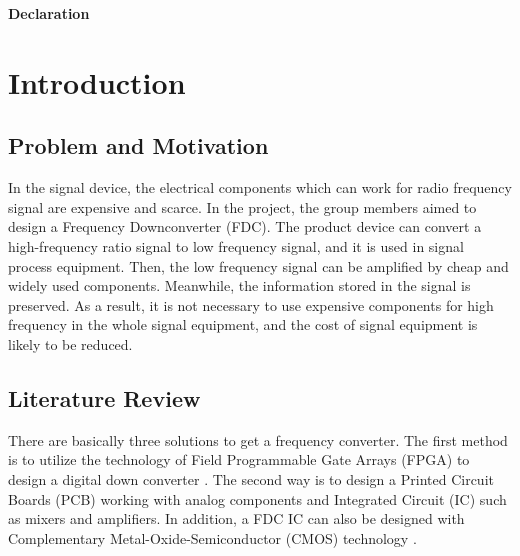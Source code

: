 \documentclass[12pt, a4paper]{report}
\begin{document}
\newpage

\rule{0mm}{30mm}

\centerline{\textbf{Declaration}}




\newpage \tableofcontents
\newpage \listoffigures
\newpage \listoftables 

\newpage \onehalfspace



\chapter{Introduction}

\section{Problem and Motivation}
In the signal device, the electrical components which can work for radio frequency signal are expensive and scarce. In the project, the group members aimed to design a Frequency Downconverter (FDC). The product device can convert a high-frequency ratio signal to low frequency signal, and it is used in signal process equipment. Then, the low frequency signal can be amplified by cheap and widely used components. Meanwhile, the information stored in the signal is preserved. As a result, it is not necessary to use expensive components for high frequency in the whole signal equipment, and the cost of signal equipment is likely to be reduced. 

\section{Literature Review}

There are basically three solutions to get a frequency converter. The first method is to utilize the technology of Field Programmable Gate Arrays (FPGA) to design a digital down converter \cite{yang}. The second way is to design a Printed Circuit Boards (PCB) working with analog components and Integrated Circuit (IC) such as mixers and amplifiers. In addition, a FDC IC can also be designed with Complementary Metal-Oxide-Semiconductor (CMOS) technology \cite{cmos}.
\end{document}
